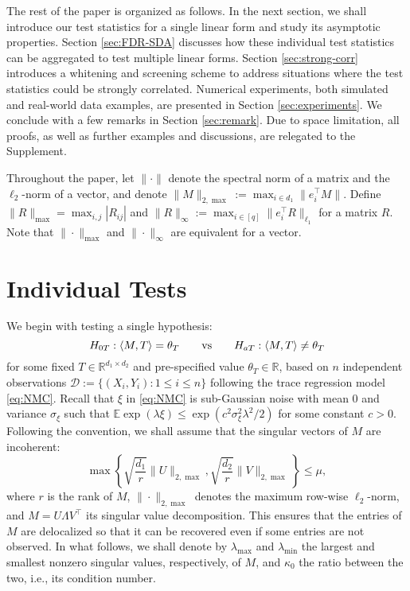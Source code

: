 \documentclass[12pt]{article}
\newcommand{\R}{\mathbb{R}}
\newcommand{\E}{\mathbb{E}}
\newcommand{\cD}{\mathcal{D}}
\theoremstyle{plain}
\begin{document}
\begin{sloppypar}
The rest of the paper is organized as follows. In the next section, we shall introduce our test statistics for a single linear form and study its asymptotic properties. Section \ref{sec:FDR-SDA} discusses how these individual test statistics can be aggregated to test multiple linear forms. Section \ref{sec:strong-corr} introduces a whitening and screening scheme to address situations where the test statistics could be strongly correlated. Numerical experiments, both simulated and real-world data examples, are presented in Section \ref{sec:experiments}. We conclude with a few remarks in Section \ref{sec:remark}. Due to space limitation, all proofs, as well as further examples and discussions, are relegated to the Supplement.

Throughout the paper, let $\|\cdot\|$ denote the spectral norm of a matrix and the $\ell_2$-norm of a vector, and  denote $\|M\|_{2,\max}:=\max_{i\in d_1}\|e_i^{\top}M\|$. Define $\|R\|_{\max}=\max_{i,j}|R_{ij}|$ and $\|R\|_{\infty}:=\max_{i\in[q]} \|e_i^{\top} R\|_{\ell_1}$ for a matrix $R$. Note that $\|\cdot\|_{\max}$ and $\|\cdot\|_{\infty}$ are equivalent for a vector. 

\section{Individual Tests}\label{sec:clt}

We begin with testing a single hypothesis:
\begin{equation}\label{eq:general-rtt}
	H_{0T}: \langle M, T\rangle =\theta_{T}\qquad {\rm vs}\qquad  H_{aT}: \langle M, T\rangle \neq \theta_{T}
\end{equation}
for some fixed $T\in\R^{d_1\times d_2}$ and pre-specified value $\theta_T\in \R$, based on $n$ independent observations $\cD:=\{(X_i,Y_i): 1\le i\le n\}$ following the trace regression model \eqref{eq:NMC}. Recall that $\xi$ in \eqref{eq:NMC} is sub-Gaussian noise with mean $0$ and variance $\sigma_\xi$ such that $\E \exp{(\lambda \xi)}\le \exp{(c^2 \sigma_\xi^2\lambda^2 /2 )}$ for some constant $c>0$. Following the convention, we shall assume that the singular vectors of $M$ are incoherent:
\begin{equation}\label{eq:incoherence}
	\max \left\{\sqrt{\frac{d_1}{r}}\|U\|_{2, \max }, \sqrt{\frac{d_2}{r}}\|V\|_{2, \max }\right\} \leq \mu,
\end{equation}
where $r$ is the rank of $M$, $\|\cdot\|_{2,\max}$ denotes the maximum row-wise $\ell_2$-norm, and $M=U\Lambda V^\top$ its singular value decomposition. This ensures that the entries of $M$ are delocalized so that it can be recovered even if some entries are not observed. In what follows, we shall denote by $\lambda_{\max}$ and $\lambda_{\min}$ the largest and smallest nonzero singular values, respectively, of $M$, and $\kappa_0$ the ratio between the two, i.e., its condition number.


\end{sloppypar}
\end{document}
